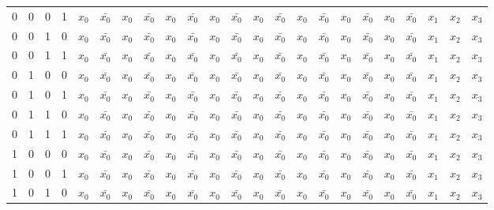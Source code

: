 \documentclass[12pt,openany,a4paper]{book}
\begin{document}
\begin{landscape}
\begin{table}[H]
\begin{tabular}{|cccc|ccccccccccccccccccc|}
    0     & 0     & 0     & 1     & $x_0$ & $\bar{x_0}$ & $x_0$ & $\bar{x_0}$ & $x_0$ & $\bar{x_0}$ & $x_0$ & $\bar{x_0}$ & $x_0$ & $\bar{x_0}$ & $x_0$ & $\bar{x_0}$ & $x_0$ & $\bar{x_0}$ & $x_0$ & $\bar{x_0}$ & $x_1$ & $x_2$ & $x_3$ \\
    0     & 0     & 1     & 0     & $x_0$ & $\bar{x_0}$ & $x_0$ & $\bar{x_0}$ & $x_0$ & $\bar{x_0}$ & $x_0$ & $\bar{x_0}$ & $x_0$ & $\bar{x_0}$ & $x_0$ & $\bar{x_0}$ & $x_0$ & $\bar{x_0}$ & $x_0$ & $\bar{x_0}$ & $x_1$ & $x_2$ & $x_3$ \\
    0     & 0     & 1     & 1     & $x_0$ & $\bar{x_0}$ & $x_0$ & $\bar{x_0}$ & $x_0$ & $\bar{x_0}$ & $x_0$ & $\bar{x_0}$ & $x_0$ & $\bar{x_0}$ & $x_0$ & $\bar{x_0}$ & $x_0$ & $\bar{x_0}$ & $x_0$ & $\bar{x_0}$ & $x_1$ & $x_2$ & $x_3$ \\
    0     & 1     & 0     & 0     & $x_0$ & $\bar{x_0}$ & $x_0$ & $\bar{x_0}$ & $x_0$ & $\bar{x_0}$ & $x_0$ & $\bar{x_0}$ & $x_0$ & $\bar{x_0}$ & $x_0$ & $\bar{x_0}$ & $x_0$ & $\bar{x_0}$ & $x_0$ & $\bar{x_0}$ & $x_1$ & $x_2$ & $x_3$ \\
    0     & 1     & 0     & 1     & $x_0$ & $\bar{x_0}$ & $x_0$ & $\bar{x_0}$ & $x_0$ & $\bar{x_0}$ & $x_0$ & $\bar{x_0}$ & $x_0$ & $\bar{x_0}$ & $x_0$ & $\bar{x_0}$ & $x_0$ & $\bar{x_0}$ & $x_0$ & $\bar{x_0}$ & $x_1$ & $x_2$ & $x_3$ \\
    0     & 1     & 1     & 0     & $x_0$ & $\bar{x_0}$ & $x_0$ & $\bar{x_0}$ & $x_0$ & $\bar{x_0}$ & $x_0$ & $\bar{x_0}$ & $x_0$ & $\bar{x_0}$ & $x_0$ & $\bar{x_0}$ & $x_0$ & $\bar{x_0}$ & $x_0$ & $\bar{x_0}$ & $x_1$ & $x_2$ & $x_3$ \\
    0     & 1     & 1     & 1     & $x_0$ & $\bar{x_0}$ & $x_0$ & $\bar{x_0}$ & $x_0$ & $\bar{x_0}$ & $x_0$ & $\bar{x_0}$ & $x_0$ & $\bar{x_0}$ & $x_0$ & $\bar{x_0}$ & $x_0$ & $\bar{x_0}$ & $x_0$ & $\bar{x_0}$ & $x_1$ & $x_2$ & $x_3$ \\
    1     & 0     & 0     & 0     & $x_0$ & $\bar{x_0}$ & $x_0$ & $\bar{x_0}$ & $x_0$ & $\bar{x_0}$ & $x_0$ & $\bar{x_0}$ & $x_0$ & $\bar{x_0}$ & $x_0$ & $\bar{x_0}$ & $x_0$ & $\bar{x_0}$ & $x_0$ & $\bar{x_0}$ & $x_1$ & $x_2$ & $x_3$ \\
    1     & 0     & 0     & 1     & $x_0$ & $\bar{x_0}$ & $x_0$ & $\bar{x_0}$ & $x_0$ & $\bar{x_0}$ & $x_0$ & $\bar{x_0}$ & $x_0$ & $\bar{x_0}$ & $x_0$ & $\bar{x_0}$ & $x_0$ & $\bar{x_0}$ & $x_0$ & $\bar{x_0}$ & $x_1$ & $x_2$ & $x_3$ \\
    1     & 0     & 1     & 0     & $x_0$ & $\bar{x_0}$ & $x_0$ & $\bar{x_0}$ & $x_0$ & $\bar{x_0}$ & $x_0$ & $\bar{x_0}$ & $x_0$ & $\bar{x_0}$ & $x_0$ & $\bar{x_0}$ & $x_0$ & $\bar{x_0}$ & $x_0$ & $\bar{x_0}$ & $x_1$ & $x_2$ & $x_3$ \\

\end{tabular}
\end{table}
\end{landscape}
\end{document}
